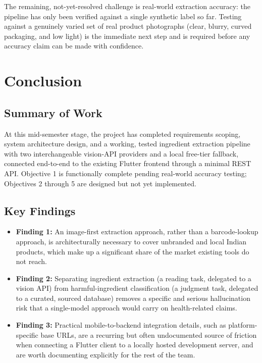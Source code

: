 \documentclass{report}
\begin{document}
The remaining, not-yet-resolved challenge is real-world extraction
accuracy: the pipeline has only been verified against a single synthetic
label so far. Testing against a genuinely varied set of real product
photographs (clear, blurry, curved packaging, and low light) is the
immediate next step and is required before any accuracy claim can be
made with confidence.


\chapter{Conclusion}

\section{Summary of Work}

At this mid-semester stage, the project has completed requirements
scoping, system architecture design, and a working, tested ingredient
extraction pipeline with two interchangeable vision-API providers and a
local free-tier fallback, connected end-to-end to the existing Flutter
frontend through a minimal REST API. Objective 1 is functionally
complete pending real-world accuracy testing; Objectives 2 through 5 are
designed but not yet implemented.

\section{Key Findings}

\begin{itemize}
  \item \textbf{Finding 1:} An image-first extraction approach, rather
    than a barcode-lookup approach, is architecturally necessary to
    cover unbranded and local Indian products, which make up a
    significant share of the market existing tools do not reach.
  \item \textbf{Finding 2:} Separating ingredient extraction (a reading
    task, delegated to a vision API) from harmful-ingredient
    classification (a judgment task, delegated to a curated, sourced
    database) removes a specific and serious hallucination risk that a
    single-model approach would carry on health-related claims.
  \item \textbf{Finding 3:} Practical mobile-to-backend integration
    details, such as platform-specific base URLs, are a recurring but
    often undocumented source of friction when connecting a Flutter
    client to a locally hosted development server, and are worth
    documenting explicitly for the rest of the team.
\end{itemize}
\end{document}
